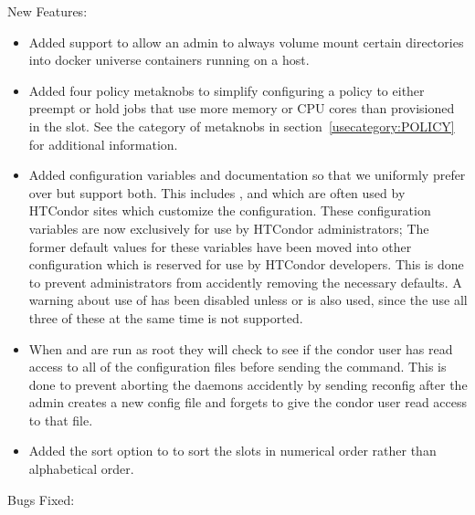 \noindent New Features:

\begin{itemize}

\item Added support to allow an admin to always volume mount
	certain directories into docker universe containers running
	on a host.

\item Added four policy metaknobs to simplify configuring a policy
	to either preempt or hold jobs that use more memory
	or CPU cores than provisioned in the slot. See the 
	category of metaknobs in section~\ref{usecategory:POLICY} for
	additional information.

\item Added configuration variables and documentation so that we uniformly prefer
     over  but support both. This includes
    ,  and 
    which are often used by HTCondor sites which customize the configuration. These
    configuration variables are now exclusively for use by HTCondor administrators;
    The former default values for these variables have been moved into other configuration
    which is reserved for use by HTCondor developers.  This is done to prevent administrators
    from accidently removing the necessary defaults.
    A warning about use of  has been disabled unless
     or is also used, since
    the use all three of these at the same time is not supported.

\item When  and  are run as root
    they will check to see if the condor user has read access to all of the
    configuration files before sending the command. This is done to prevent aborting the daemons
    accidently by sending reconfig after the admin creates a new config file and
    forgets to give the condor user read access to that file.

\item Added the  sort option to  to sort the slots
    in numerical order rather than alphabetical order.

\end{itemize}

\noindent Bugs Fixed:

